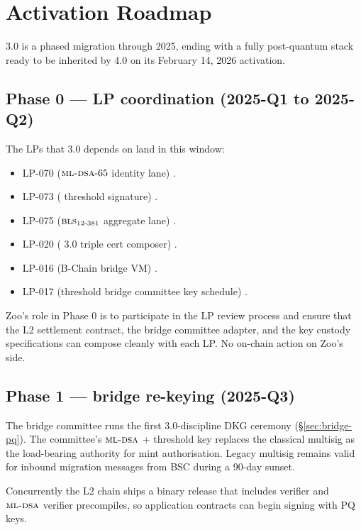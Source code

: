 \section{Activation Roadmap}
\label{sec:roadmap}

\Zoo{} 3.0 is a phased migration through 2025, ending with a fully
post-quantum stack ready to be inherited by \Zoo{} 4.0 \cite{zoo-4-0}
on its February 14, 2026 activation.

\subsection{Phase 0 --- LP coordination (2025-Q1 to 2025-Q2)}

The \Lux{} LPs that 3.0 depends on land in this window:

\begin{itemize}[leftmargin=1.2em]
  \item LP-070 ($\textsc{ml-dsa}{}\text{-}65$ identity lane) \cite{lp-070}.
  \item LP-073 (\Corona{} threshold signature) \cite{lp-073}.
  \item LP-075 ($\textsc{bls}{}_{12\text{-}381}$ aggregate lane) \cite{lp-075}.
  \item LP-020 (\Quasar{} 3.0 triple cert composer) \cite{lp-020}.
  \item LP-016 (B-Chain bridge VM) \cite{lp-016}.
  \item LP-017 (threshold bridge committee key schedule)
        \cite{lp-017}.
\end{itemize}

Zoo's role in Phase 0 is to participate in the LP review process and
ensure that the \Zoo{} L2 settlement contract, the bridge committee
adapter, and the \DAO{} key custody specifications can compose
cleanly with each LP. No on-chain action on Zoo's side.

\subsection{Phase 1 --- bridge re-keying (2025-Q3)}

The bridge committee runs the first 3.0-discipline DKG ceremony
(\S\ref{sec:bridge-pq}). The committee's $\textsc{ml-dsa}{}$ + \Corona{}
threshold key replaces the classical multisig as the load-bearing
authority for mint authorisation. Legacy multisig remains valid for
inbound migration messages from BSC during a 90-day sunset.

Concurrently the \Zoo{} L2 chain ships a binary release that
includes \Corona{} verifier and $\textsc{ml-dsa}{}$ verifier precompiles,
so application contracts can begin signing with PQ keys.

